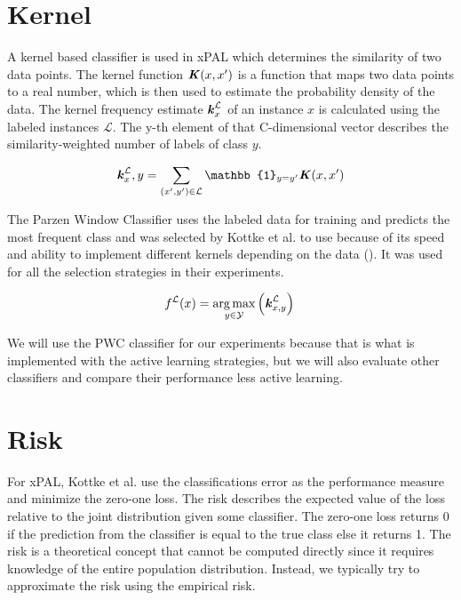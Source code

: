 \section{Kernel}

A kernel based classifier is used in xPAL which determines the similarity of two data points. The kernel function $\textbf{\textit{K}}(x,x')$ is a function that maps two data points to a real number, which is then used to estimate the probability density of the data. The kernel frequency estimate $\textbf{\textit{k}}^{\mathcal{L}}_x$ of an instance $x$ is calculated using the labeled instances $\mathcal{L}$. The y-th element of that C-dimensional vector describes the similarity-weighted number of labels of class $y$.

\begin{equation}
\textbf{\textit{k}}^{\mathcal{L}}_x,y = \sum_{(x',y') \in \mathcal{L}} \mathbb{1}_{y=y'} \textbf{\textit{K}}(x,x')
\label{eq:kernel}
\end{equation}

The Parzen Window Classifier uses the labeled data for training and predicts the most frequent class and was selected by Kottke et al. to use because of its speed and ability to implement different kernels depending on the data (\cite{kottke2021toward}). It was used for all the selection strategies in their experiments. 

\begin{equation}
f^{\mathcal{L}}(x) = \underset{y \in \mathcal{Y}}{\arg \max} \left( \textbf{\textit{k}}^{\mathcal{L}}_{x,y} \right) \\
\end{equation}

We will use the PWC classifier for our experiments because that is what is implemented with the active learning strategies, but we will also evaluate other classifiers and compare their performance less active learning.

\section{Risk}

For xPAL, Kottke et al. use the classifications error as the performance measure and minimize the zero-one loss. The risk describes the expected value of the loss relative to the joint distribution given some classifier. The zero-one loss returns 0 if the prediction from the classifier is equal to the true class else it returns 1. The risk is a theoretical concept that cannot be computed directly since it requires knowledge of the entire population distribution. Instead, we typically try to approximate the risk using the empirical risk.

